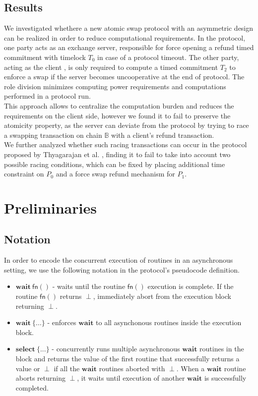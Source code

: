 \documentclass{article}      	%
\begin{document}
\subsection{Results}

We investigated whethere a new atomic swap protocol with an asymmetric design can be realized in order to reduce computational requirements. In the protocol, one party acts as an exchange server, responsible for force opening a refund timed commitment with timelock $T_0$ in case of a protocol timeout. The other party, acting as the client , is only required to compute a timed commitment $T_2$ to enforce a swap if the server becomes uncooperative at the end of protocol. The role division minimizes computing power requirements and computations performed in a protocol run. \\
This approach allows to centralize the computation burden and reduces the requirements on the client side, however we found it to fail to preserve the atomicity property, as the server can deviate from the protocol by trying to race a swapping transaction on chain $\mathbb{B}$ with a client's refund transaction. \\
We further analyzed whether such racing transactions can occur in the protocol proposed by Thyagarajan et al. \cite{uas}, finding it to fail to take into account two possible racing conditions, which can be fixed by placing additional time constraint on $P_0$ and a force swap refund mechanism for $P_1$.

\section{Preliminaries}

\subsection{Notation}

In order to encode the concurrent execution of routines in an asynchronous setting, we use the following notation in the protocol's pseudocode definition.
\begin{itemize}[nosep, noitemsep]
    \item $\mathbf{wait} \: \mathsf{fn}()$ - waits until the routine $\mathsf{fn}()$ execution is complete. If the routine $\mathsf{fn}()$ returns $\perp$, immediately abort from the execution block returning $\perp$. \\
    \item $\mathbf{wait} \: \{...\}$ - enforces $\mathbf{wait}$ to all asynchonous routines inside the execution block. \\
    \item $\mathbf{select} \: \{...\}$ - concurrently runs multiple asynchronous $\mathbf{wait}$ routines in the block and returns the value of the first routine that successfully returns a value or $\perp$ if all the $\mathbf{wait}$ routines aborted with $\perp$. When a $\mathbf{wait}$ routine aborts returning $\perp$, it waits until execution of another $\mathbf{wait}$ is successfully completed. \\
\end{itemize}
\end{document}
